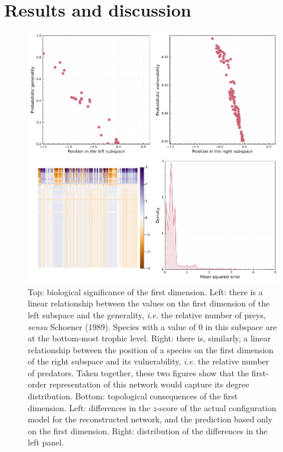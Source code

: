 \documentclass[10pt,oneside]{article}
\makeatletter
\def\maxwidth{\ifdim\Gin@nat@width>\linewidth\linewidth
\else\Gin@nat@width\fi}
\let\Oldincludegraphics\includegraphics
\renewcommand{\includegraphics}[1]{\Oldincludegraphics[width=\maxwidth]{#1}}
\makeatother
\begin{document}
\hypertarget{results-and-discussion}{%
\section{Results and discussion}\label{results-and-discussion}}

\begin{figure}
\hypertarget{fig:degree}{%
\centering
\includegraphics{figures/figure-degree.png}
\caption{Top: biological significance of the first dimension. Left:
there is a linear relationship between the values on the first dimension
of the left subspace and the generality, \emph{i.e.} the relative number
of preys, \emph{sensu} Schoener (1989). Species with a value of 0 in
this subspace are at the bottom-most trophic level. Right: there is,
similarly, a linear relationship between the position of a species on
the first dimension of the right subspace and its vulnerability,
\emph{i.e.} the relative number of predators. Taken together, these two
figures show that the first-order representation of this network would
capture its degree distribution. Bottom: topological consequences of the
first dimension. Left: differences in the \(z\)-score of the actual
configuration model for the reconstructed network, and the prediction
based only on the first dimension. Right: distribution of the
differences in the left panel.}\label{fig:degree}
}
\end{figure}
\end{document}
